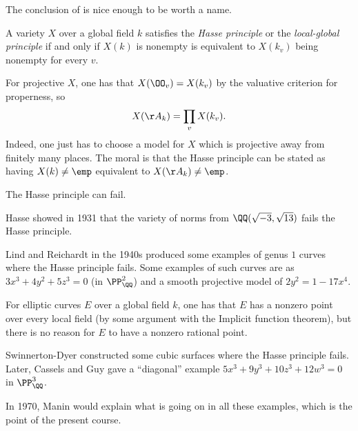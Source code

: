 \documentclass[../notes.tex]{subfiles}
\begin{document}
The conclusion of  is nice enough to be worth a name.
\begin{definition}
	A variety $X$ over a global field $k$ satisfies the \textit{Hasse principle} or the \textit{local-global principle} if and only if $X(k)$ is nonempty is equivalent to $X(k_v)$ being nonempty for every $v$.
\end{definition}
\begin{remark}
	For projective $X$, one has that $X(\OO_v)=X(k_v)$ by the valuative criterion for properness, so
	\[X(\AA_k)=\prod_vX(k_v).\]
	Indeed, one just has to choose a model for $X$ which is projective away from finitely many places. The moral is that the Hasse principle can be stated as having $X(k)\ne\emp$ equivalent to $X(\AA_k)\ne\emp$.
\end{remark}
The Hasse principle can fail.
\begin{example}
	Hasse showed in 1931 that the variety of norms from $\QQ(\sqrt{-3},\sqrt{13})$ fails the Hasse principle.
\end{example}
\begin{example}
	Lind and Reichardt in the 1940s produced some examples of genus $1$ curves where the Hasse principle fails. Some examples of such curves are as $3x^3+4y^2+5z^3=0$ (in $\PP^2_\QQ$) and a smooth projective model of $2y^2=1-17x^4$.
\end{example}
\begin{remark}
	For elliptic curves $E$ over a global field $k$, one has that $E$ has a nonzero point over every local field (by some argument with the Implicit function theorem), but there is no reason for $E$ to have a nonzero rational point.
\end{remark}
\begin{example}
	Swinnerton-Dyer constructed some cubic surfaces where the Hasse principle fails. Later, Cassels and Guy gave a ``diagonal'' example $5x^3+9y^3+10z^3+12w^3=0$ in $\PP^3_\QQ$.
\end{example}
In 1970, Manin would explain what is going on in all these examples, which is the point of the present course.
\end{document}
